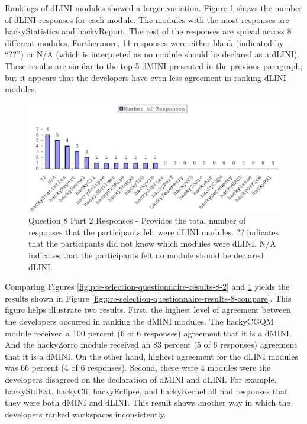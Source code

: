 Rankings of dLINI modules showed a larger variation. Figure
\ref{fig:pre-selection-questionnaire-results-82-2} shows the number of
dLINI responses for each module. The modules with the most responses are
hackyStatistics and hackyReport. The rest of the responses are spread
across 8 different modules. Furthermore, 11 responses were either blank
(indicated by ``??'') or N/A (which is interpreted as no module should be
declared as a dLINI). These results are similar to the top 5 dMINI
presented in the previous paragraph, but it appears that the developers
have even less agreement in ranking dLINI modules.

\begin{figure}[!h]
  \centering
  \includegraphics[width=1.0\textwidth]{figs/Results/pre-selection-questionnaire-82-sort.eps}
  \caption[Question 8 Part 2 Responses]{Question 8 Part 2 Responses -
    Provides the total number of responses that the participants felt were
    dLINI modules. ?? indicates that the participants did not know which
    modules were dLINI. N/A indicates that the participants felt no module
    should be declared dLINI.}
  \label{fig:pre-selection-questionnaire-results-82-2}
\end{figure}

Comparing Figures \ref{fig:pre-selection-questionnaire-results-8-2} and
\ref{fig:pre-selection-questionnaire-results-82-2} yields the results shown
in Figure \ref{fig:pre-selection-questionnaire-results-8-compare}. This
figure helps illustrate two results. First, the highest level of agreement
between the developers occurred in ranking the dMINI modules. The hackyCGQM
module received a 100 percent (6 of 6 responses) agreement that it is a
dMINI. And the hackyZorro module received an 83 percent (5 of 6 responses)
agreement that it is a dMINI. On the other hand, highest agreement for the
dLINI modules was 66 percent (4 of 6 responses). Second, there were 4
modules were the developers disagreed on the declaration of dMINI and
dLINI. For example, hackyStdExt, hackyCli, hackyEclipse, and hackyKernel
all had responses that they were both dMINI and dLINI. This result shows
another way in which the developers ranked workspaces inconsistently.

